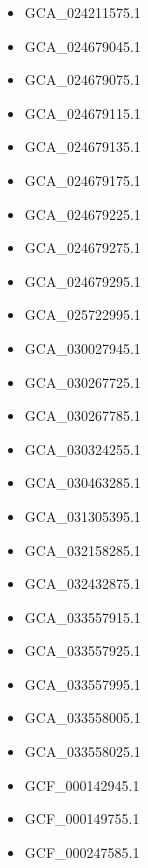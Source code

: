 \begin{itemize}
    \item GCA\_024211575.1
    \item GCA\_024679045.1
    \item GCA\_024679075.1
    \item GCA\_024679115.1
    \item GCA\_024679135.1
    \item GCA\_024679175.1
    \item GCA\_024679225.1
    \item GCA\_024679275.1
    \item GCA\_024679295.1
    \item GCA\_025722995.1
    \item GCA\_030027945.1
    \item GCA\_030267725.1
    \item GCA\_030267785.1
    \item GCA\_030324255.1
    \item GCA\_030463285.1
    \item GCA\_031305395.1
    \item GCA\_032158285.1
    \item GCA\_032432875.1
    \item GCA\_033557915.1
    \item GCA\_033557925.1
    \item GCA\_033557995.1
    \item GCA\_033558005.1
    \item GCA\_033558025.1
    \item GCF\_000142945.1
    \item GCF\_000149755.1
    \item GCF\_000247585.1
\end{itemize}

